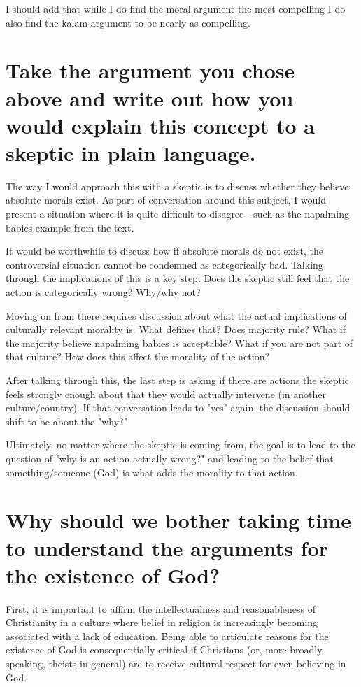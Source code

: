 \documentclass[12pt]{turabian-researchpaper}
\begin{document}
I should add that while I do find the moral argument the most compelling I do also find the kalam argument to be nearly as compelling.

\section{Take the argument you chose above and write out how you would explain this concept to a skeptic in plain language.}

The way I would approach this with a skeptic is to discuss whether they believe absolute morals exist. As part of conversation around this subject, I would present a situation where it is quite difficult to disagree - such as the napalming babies example from the text. 

It would be worthwhile to discuss how if absolute morals do not exist, the controversial situation cannot be condemned as categorically bad. Talking through the implications of this is a key step. Does the skeptic still feel that the action is categorically wrong? Why/why not?

Moving on from there requires discussion about what the actual implications of culturally relevant morality is. What defines that? Does majority rule? What if the majority believe napalming babies is acceptable? What if  you are not part of that culture? How does this affect the morality of the action?

After talking through this, the last step is asking if there are actions the skeptic feels strongly enough about that they would actually intervene (in another culture/country). If that conversation leads to "yes" again, the discussion should shift to be about the "why?"

Ultimately, no matter where the skeptic is coming from, the goal is to lead to the question of "why is an action actually wrong?" and leading to the belief that something/someone (God) is what adds the morality to that action.

\section{Why should we bother taking time to understand the arguments for the existence of God?}

First, it is important to affirm the intellectualness and reasonableness of Christianity in a culture where belief in religion is increasingly becoming associated with a lack of education. Being able to articulate reasons for the existence of God is consequentially critical if Christians (or, more broadly speaking, theists in general) are to receive cultural respect for even believing in God.
\end{document}
